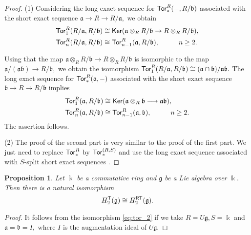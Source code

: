 \documentclass{amsart}
\numberwithin{equation}{section}
\newtheorem{proposition}[theorem]{Proposition}
\theoremstyle{definition}
\def\gg{\mathfrak{g}}
\def\kk{\Bbbk}
\def\aa{\mathfrak{a}}
\def\bb{\mathfrak{b}}
\begin{document}
\begin{proof}
(1) Considering the long exact sequence for ${\sf Tor}^R_*(-,R/\mathfrak{b})$ associated with the short exact sequence $\aa \to R\to R/\aa,$ we obtain 
\begin{equation*}
\begin{split}
{\sf Tor}^R_1(R/\aa,R/\bb)&\cong {\sf Ker}( \aa\otimes_R R/\bb \to R\otimes_R R/\bb),\\
{\sf Tor}^R_n(R/\aa, R/\bb)&\cong {\sf Tor}^R_{n-1}(\aa,R/\bb), \hspace{1cm}n\geq 2.
\end{split}
\end{equation*}

Using that the map $ \aa \otimes_R R/\bb \to R\otimes_R R/\bb $ is isomorphic to the map $\aa/(\aa\bb)\to R/\bb,$ we obtain the isomorphism ${\sf Tor}_1^R(R/\aa,R/\bb)\cong (\aa\cap \bb)/\aa\bb.$ 
The long exact sequence for ${\sf Tor}^R_*(\aa,-)$ associated with the short exact sequence $\bb \to R \to R/\bb $ implies 
\begin{equation*}
\begin{split}
{\sf Tor}_1^R(\aa,R/\bb)&\cong {\sf Ker}(\aa\otimes_R\bb \longrightarrow \aa\bb),\\
{\sf Tor}_n^R(\aa,R/\bb)&\cong{\sf Tor}^R_{n-1}(\aa,\bb), \hspace{1cm} n\geq 2. 
\end{split}
\end{equation*}
The assertion follows. 

(2) The proof of the second part is very similar to the proof of the first part. We just need to replace ${\sf Tor}^R_*$ by ${\sf Tor}^{(R,S)}_*$ and use the long exact sequence associated with $S$-split short exact sequences 
\cite[Ch.IX,(8.6)]{maclane2012homology}.
\end{proof}


\begin{proposition}\label{prop:T-RT}
Let $\kk$ be a commutative ring and $\gg$ be a Lie algebra over $\kk.$ Then there is a natural isomorphism
$$H_2^{\sf T}(\gg)\cong H_2^{\sf RT}(\gg).$$
\end{proposition}
\begin{proof}
It follows from the isomorphism \eqref{eq:tor_2} if we take $R=U\gg, S=\kk$ and $\aa=\bb=I,$ where $I$ is the augmentation ideal of $U\gg.$
\end{proof}
\end{document}
